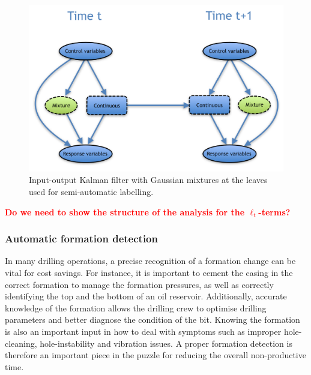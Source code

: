 \begin{figure}[ht!]
\begin{center}
\includegraphics[scale=0.5]{./figures/VT_Scenario2} 
\caption{\label{Figure:VTScenario2}  Input-output Kalman filter with Gaussian mixtures at the leaves used for semi-automatic labelling.}
\end{center}
\end{figure}

\textcolor{red}{\bf Do we need to show the structure of the analysis for the $\ell_t$-terms?}

\subsubsection{Automatic formation detection}\label{SubSection:DetectionFormation}

In many drilling operations, a precise recognition of a formation change can be vital for cost savings. 
For instance, it is important to cement the casing in the correct formation to manage the formation pressures, as well as correctly identifying the top and the bottom of an oil reservoir. 
Additionally, accurate knowledge of the formation allows the drilling crew to optimise drilling parameters and better diagnose the condition of the bit. 
Knowing the formation is also an important input in how to deal with symptoms such as improper hole-cleaning, hole-instability and vibration issues. 
A proper formation detection is therefore an important piece in the puzzle for reducing the overall non-productive time.

